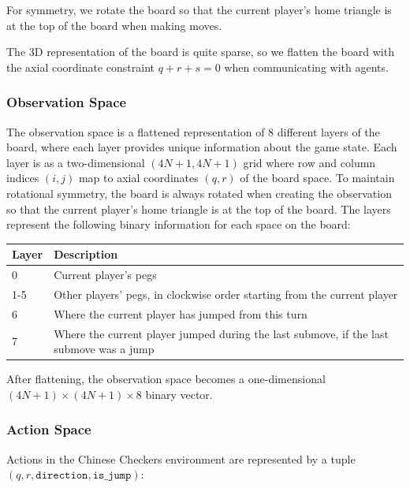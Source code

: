 \documentclass[12pt, a4paper, twocolumn]{article}
\begin{document}
For symmetry, we rotate the board so that the current player's home triangle is at the top of the board when making moves. 
  
The 3D representation of the board is quite sparse, so we flatten the board with the axial coordinate constraint $q + r + s = 0$ when communicating with agents.

\subsubsection{Observation Space}

The observation space is a flattened representation of 8 different layers of the board, where each layer provides unique information about the game state. Each layer is as a two-dimensional $(4N + 1, 4N + 1)$ grid where row and column indices $(i, j)$ map to axial coordinates $(q, r)$ of the board space. To maintain rotational symmetry, the board is always rotated when creating the observation so that the current player's home triangle is at the top of the board. The layers represent the following binary information for each space on the board:

\begin{center}
\begin{tabular}{|m{}|m{}|}
  \hline
  Layer & Description \\
  \hline
  0 & Current player's pegs \\
  1-5 & Other players' pegs, in clockwise order starting from the current player \\
  6 & Where the current player has jumped from this turn \\
  7 & Where the current player jumped during the last submove, if the last submove was a jump \\
  \hline
\end{tabular}
\end{center}

After flattening, the observation space becomes a one-dimensional $(4N + 1) \times (4N + 1) \times 8$ binary vector.


\subsubsection{Action Space}

Actions in the Chinese Checkers environment are represented by a tuple $(q, r, \texttt{direction}, \texttt{is\_jump})$:
\end{document}
